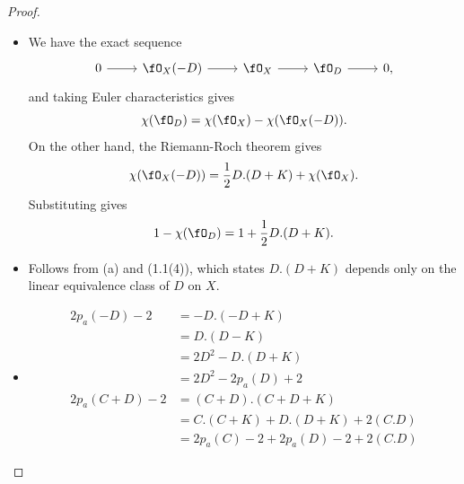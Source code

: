\documentclass[a4paper]{article}
\begin{document}
\begin{enumerate} [label=\textbf{\arabic*.}, leftmargin=0em]
          \begin{proof} $ $ \vspace{0pt}
              \begin{itemize} [leftmargin=0cm]
                  \item[(a)] We have the exact sequence
                        \[ \begin{tikzcd}
                                0 \arrow[r] & \fO_X(-D) \arrow[r] & \fO_X \arrow[r] & \fO_D \arrow[r] & 0,
                            \end{tikzcd} \]
                        and taking Euler characteristics gives
                        \begin{equation*}
                            \chi(\fO_D) = \chi(\fO_X) - \chi(\fO_X(-D)).
                        \end{equation*}
                        On the other hand, the Riemann-Roch theorem gives
                        \begin{equation*}
                            \chi(\fO_X(-D)) = \frac{1}{2}D.(D + K) + \chi(\fO_X).
                        \end{equation*}
                        Substituting gives
                        \begin{equation*}
                            1 - \chi(\fO_D) = 1 + \frac{1}{2}D.(D + K).
                        \end{equation*}

                  \item[(b)] Follows from (a) and (1.1(4)), which states $D.(D + K)$ depends only on the linear equivalence class of $D$ on $X$.
                  \item[(c)]
                        \begin{align*}
                            2p_a(-D) - 2    & = -D.(-D + K)                        \\
                                            & = D.(D - K)                          \\
                                            & = 2D^2 - D.(D + K)                   \\
                                            & = 2D^2 - 2p_a(D) + 2                 \\
                            2p_a(C + D) - 2 & = (C + D).(C + D + K)                \\
                                            & = C.(C + K) + D.(D + K) + 2(C.D)     \\
                                            & = 2p_a(C) - 2 + 2p_a(D) - 2 + 2(C.D)
                        \end{align*}
              \end{itemize}
          \end{proof}


\end{enumerate}
\end{document}
